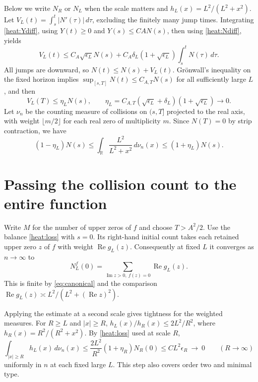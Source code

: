 \documentclass[11pt,a4paper]{article}
\numberwithin{equation}{section}
\renewcommand{\Re}{\operatorname{Re}}\renewcommand{\Im}{\operatorname{Im}}
\begin{document}
Below we write $N_R$ or $N_L$ when the scale matters and $h_L(x)=L^2/(L^2+x^2)$. Let $V_L(t)=\int_s^t |N'(\tau)|\,d\tau$, excluding the finitely
many jump times. Integrating \eqref{heat:Ydiff}, using $Y(t)\ge0$
and $Y(s)\le CA N(s)$, then using \eqref{heat:Ndiff}, yields
\[
 V_L(t)\le C_A\sqrt{\epsilon_L} N(s)
             +C_A\delta_L(1+\sqrt{\epsilon_L})\int_s^t N(\tau)\,d\tau .
\]
All jumps are downward, so $N(t)\le N(s)+V_L(t)$. Grönwall's
inequality on the fixed horizon implies
$\sup_{[s,T]}N(t)\le C_{A,T}N(s)$ for all sufficiently large $L$,
and then
\[
 V_L(T)\le\eta_L N(s),\qquad
 \eta_L=C_{A,T}(\sqrt{\epsilon_L}+\delta_L)(1+\sqrt{\epsilon_L})
 \longrightarrow0 .
\]
Let $\nu_n$ be the counting measure of collisions on $(s,T]$
projected to the real axis, with weight $\lfloor m/2\rfloor$
for each real zero of multiplicity $m$. Since $N(T)=0$ by strip
contraction, we have
\begin{equation}\label{heat:loss}
 (1-\eta_L)N(s)\le \int_{\mathbb R}\frac{L^2}{L^2+x^2}\,d\nu_n(x)
                      \le (1+\eta_L)N(s).
\end{equation}

\section{Passing the collision count to the entire function}
Write $M$ for the number of upper zeros of $f$ and choose $T>A^2/2$.
Use the balance \eqref{heat:loss} with $s=0$. Its right-hand initial
count takes each retained upper zero $z$ of $f$ with weight $\Re g_L(z)$.
Consequently at fixed $L$ it converges as $n\to\infty$ to
\[
              N_L^f(0)=\sum_{\Im z>0,\ f(z)=0}\Re g_L(z).
\]
This is finite by \eqref{eq:canonical} and the comparison
$\Re g_L(z)\asymp L^2/(L^2+(\Re z)^2)$.

Applying the estimate at a second scale gives tightness for the
weighted measures. For $R\ge L$ and $|x|\ge R$,
$h_L(x)/h_R(x)\le 2L^2/R^2$, where $h_R(x)=R^2/(R^2+x^2)$.
By \eqref{heat:loss} used at scale $R$,
\[
 \int_{|x|\ge R}h_L(x)\,d\nu_n(x)
 \le \frac{2L^2}{R^2}(1+\eta_R) N_R(0)
 \le C L^2\epsilon_R\ \longrightarrow\ 0
 \qquad(R\to\infty)
\]
uniformly in $n$ at each fixed large $L$. This step also covers
order two and minimal type.
\end{document}

